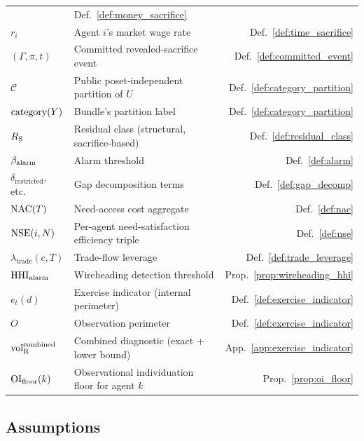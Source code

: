 \begin{center}
\begin{tabular}{@{}llr@{}}
  & Def.~\ref{def:money_sacrifice} \\
$r_i$ & Agent $i$'s market wage rate
  & Def.~\ref{def:time_sacrifice} \\
$(\Gamma, \pi, t)$ & Committed revealed-sacrifice event
  & Def.~\ref{def:committed_event} \\
$\mathcal{C}$ & Public poset-independent partition of $U$
  & Def.~\ref{def:category_partition} \\
$\mathrm{category}(Y)$ & Bundle's partition label
  & Def.~\ref{def:category_partition} \\
$R_{\mathrm{S}}$ & Residual class (structural, sacrifice-based)
  & Def.~\ref{def:residual_class} \\
$\beta_{\mathrm{alarm}}$ & Alarm threshold
  & Def.~\ref{def:alarm} \\
$\delta_{\mathrm{restricted}}$, etc. & Gap decomposition terms
  & Def.~\ref{def:gap_decomp} \\
$\mathrm{NAC}(T)$ & Need-access cost aggregate
  & Def.~\ref{def:nac} \\
$\mathrm{NSE}(i, N)$ & Per-agent need-satisfaction efficiency triple
  & Def.~\ref{def:nse} \\
$\lambda_{\mathrm{trade}}(c, T)$ & Trade-flow leverage
  & Def.~\ref{def:trade_leverage} \\
$\mathrm{HHI}_{\mathrm{alarm}}$ & Wireheading detection threshold
  & Prop.~\ref{prop:wireheading_hhi} \\
$e_t(d)$ & Exercise indicator (internal perimeter)
  & Def.~\ref{def:exercise_indicator} \\
$O$ & Observation perimeter
  & Def.~\ref{def:exercise_indicator} \\
${\operatorname{vol}_{\mathrm{R}}^{\mathrm{combined}}}$ & Combined diagnostic (exact + lower bound)
  & App.~\ref{app:exercise_indicator} \\
$\mathrm{OI}_{\mathrm{floor}}(k)$ & Observational individuation floor for agent $k$
  & Prop.~\ref{prop:oi_floor} \\
\bottomrule
\end{tabular}
\end{center}

\subsection{Assumptions}

